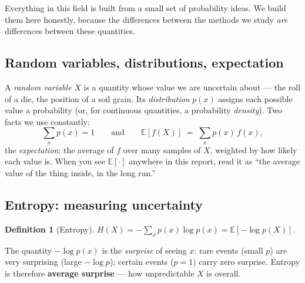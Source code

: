\documentclass[11pt,a4paper]{article}
\newtheorem{definition}{Definition}
\begin{document}
Everything in this field is built from a small set of probability ideas. We build
them here honestly, because the differences between the methods we study
\emph{are} differences between these quantities.

\subsection{Random variables, distributions, expectation}

A \emph{random variable} $X$ is a quantity whose value we are uncertain about ---
the roll of a die, the position of a soil grain. Its \emph{distribution} $p(x)$
assigns each possible value a probability (or, for continuous quantities, a
probability \emph{density}). Two facts we use constantly:
\[
\sum_x p(x) = 1
\qquad\text{and}\qquad
\mathbb{E}[f(X)] \;=\; \sum_x p(x)\, f(x),
\]
the \emph{expectation}: the average of $f$ over many samples of $X$, weighted by
how likely each value is. When you see $\mathbb{E}[\cdot]$ anywhere in this
report, read it as ``the average value of the thing inside, in the long run.''

\subsection{Entropy: measuring uncertainty}

\begin{definition}[Entropy]
$H(X) = -\sum_x p(x) \log p(x) = \mathbb{E}[-\log p(X)]$.
\end{definition}

The quantity $-\log p(x)$ is the \emph{surprise} of seeing $x$: rare events
(small $p$) are very surprising (large $-\log p$); certain events ($p=1$) carry
zero surprise. Entropy is therefore \textbf{average surprise} --- how unpredictable
$X$ is overall.
\end{document}
